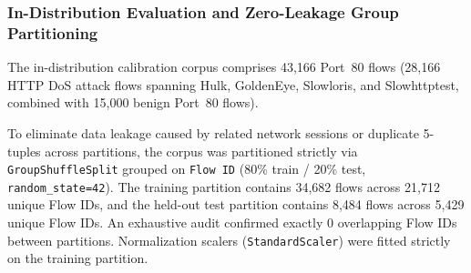 \begin{table}[t]
\centering
\caption{Deployed Service-Specific Machine Learning Model Configurations and Cryptographic Checksums.}
\label{tab:model_configurations}
\end{table}

\subsubsection{In-Distribution Evaluation and Zero-Leakage Group Partitioning}
The in-distribution calibration corpus comprises 43,166 Port~80 flows (28,166 HTTP DoS attack flows spanning Hulk, GoldenEye, Slowloris, and Slowhttptest, combined with 15,000 benign Port~80 flows). 

To eliminate data leakage caused by related network sessions or duplicate 5-tuples across partitions, the corpus was partitioned strictly via \texttt{GroupShuffleSplit} grouped on \texttt{Flow ID} (80\% train / 20\% test, \texttt{random\_state=42}). The training partition contains 34,682 flows across 21,712 unique Flow IDs, and the held-out test partition contains 8,484 flows across 5,429 unique Flow IDs. An exhaustive audit confirmed exactly 0 overlapping Flow IDs between partitions. Normalization scalers (\texttt{StandardScaler}) were fitted strictly on the training partition.

